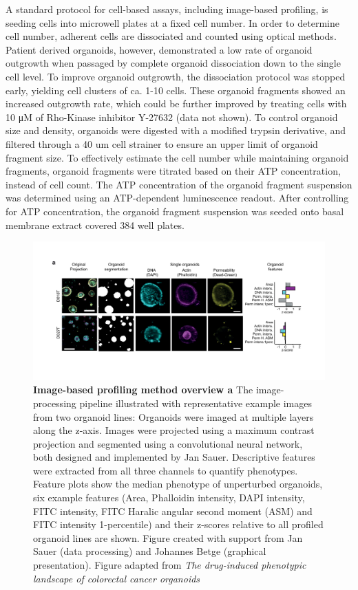 \begin{flushleft}
A standard protocol for cell-based assays, including image-based profiling, is seeding cells into microwell plates at a fixed cell number. In order to determine cell number, adherent cells are dissociated and counted using optical methods. Patient derived organoids, however, demonstrated a low rate of organoid outgrowth when passaged by complete organoid dissociation down to the single cell level. To improve organoid outgrowth, the dissociation protocol was stopped early, yielding cell clusters of ca. 1-10 cells. These organoid fragments showed an increased outgrowth rate, which could be further improved by treating cells with 10 μM of Rho-Kinase inhibitor Y-27632 (data not shown). To control organoid size and density, organoids were digested with a modified trypsin derivative, and filtered through a 40 um cell strainer to ensure an upper limit of organoid fragment size. To effectively estimate the cell number while maintaining organoid fragments, organoid fragments were titrated based on their ATP concentration, instead of cell count. The ATP concentration of the organoid fragment suspension was determined using an ATP-dependent luminescence readout. After controlling for ATP concentration, the organoid fragment suspension was seeded onto basal membrane extract covered 384 well plates.

\begin{figure}[h]
\centering
\includegraphics[width=\textwidth,
                height=\textheight,
                keepaspectratio]{figures/promise/pdf/fig_1_2.pdf}
\caption[Image-based profiling method overview]{\textbf{Image-based profiling method overview a} The image-processing pipeline illustrated with representative example images from two organoid lines: Organoids were imaged at multiple layers along the z-axis. Images were projected using a maximum contrast projection and segmented using a convolutional neural network, both designed and implemented by Jan Sauer. Descriptive features were extracted from all three channels to quantify phenotypes. Feature plots show the median phenotype of unperturbed organoids, six example features (Area, Phalloidin intensity, DAPI intensity, FITC intensity, FITC Haralic angular second moment (ASM) and FITC intensity 1-percentile) and their z-scores relative to all profiled organoid lines are shown. Figure created with support from Jan Sauer (data processing) and Johannes Betge (graphical presentation). Figure adapted from \textit{The drug-induced phenotypic landscape of colorectal cancer organoids} \citep{Betge2022-kr}}
\label{fig_135}
\end{figure}


\end{flushleft}

